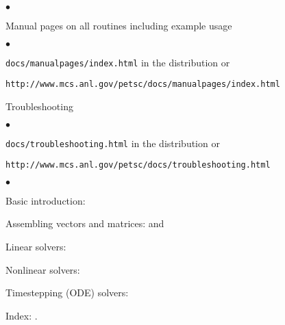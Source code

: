 


\medskip

\begin{list}{$\bullet$}
\item Manual pages on all routines including example usage
\begin{list}{$\bullet$}
   \item {\tt docs/manualpages/index.html} in the distribution or 
   \item {\tt http://www.mcs.anl.gov/petsc/docs/manualpages/index.html}
\end{list}
\item Troubleshooting
\begin{list}{$\bullet$}
   \item {\tt docs/troubleshooting.html} in the distribution or
   \item {\tt http://www.mcs.anl.gov/petsc/docs/troubleshooting.html}
\end{list}
\end{list}

\begin{list}{$\bullet$}
{
\setlength{\itemsep}{-.02in} 
\setlength{\topsep}{0in} 
\setlength{\partopsep}{0in}
}
\item Basic introduction: \pageref{sec:gettingstarted}
\item Assembling vectors and matrices: \pageref{sec:vecintro} and \pageref{sec:matintro}
\item Linear solvers: \pageref{ch:sles}
\item Nonlinear solvers: \pageref{chapter:snes}
\item Timestepping (ODE) solvers: \pageref{chapter:ts}
\item Index: \pageref{sec:index}.
\end{list}

